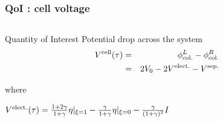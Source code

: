 \documentclass[10pt,xcolor=dvipsnames,compress]{beamer}
\begin{document}
\begin{frame}
\frametitle{QoI : cell voltage }
\vfill


\begin{columns}
\begin{column}{.47\textwidth}
\begin{alertblock}{Quantity of Interest}
 Potential drop across the system
 \begin{eqnarray*}
 V^{\rm cell}(\tau) &=& \phi_{\rm col.}^L - \phi_{\rm col.}^R \\
 		&=& 2V_0 - 2V^{\rm elect.} - V^{\rm sep.}
 \end{eqnarray*}

where 

$
V^{\rm elect.}(\tau) =  \frac{1+2\gamma}{1+\gamma}\eta|_{\xi=1} - \frac{\gamma}{1+\gamma}\eta|_{\xi=0} 
 - \frac{\gamma}{(1+\gamma)^2}I
$
\end{alertblock}


\end{column}
\end{columns}
\end{frame}
\end{document}
